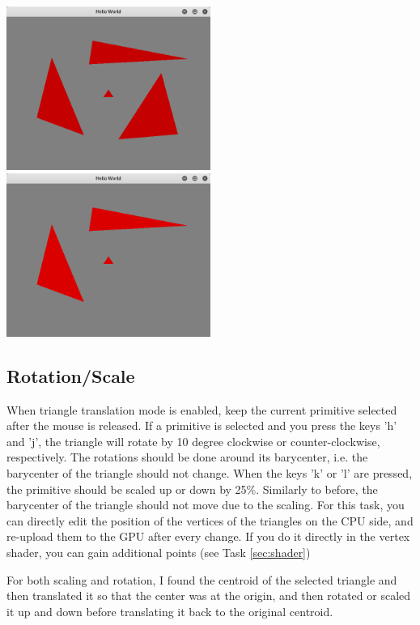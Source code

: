 \documentclass[11pt]{article}
\begin{document}
\includegraphics[width=0.5\textwidth]{deletebefore.png}
\includegraphics[width=0.5\textwidth]{deleteafter.png}
\subsection{Rotation/Scale}

When triangle translation mode is enabled, keep the current primitive selected after the mouse is released. If a primitive is selected and you press the keys 'h' and 'j', the triangle will rotate by 10 degree clockwise or counter-clockwise, respectively. The rotations should be done around its barycenter, i.e. the barycenter of the triangle should not change. When the keys 'k' or 'l' are pressed, the primitive should be scaled up or down by 25\%. Similarly to before, the barycenter of the triangle should not move due to the scaling. For this task, you can directly edit the position of the vertices of the triangles on the CPU side, and re-upload them to the GPU after every change. If you do it directly in the vertex shader, you can gain additional points (see Task \ref{sec:shader})

For both scaling and rotation, I found the centroid of the selected triangle and then translated it so that the center was at the origin, and then rotated or scaled it up and down before translating it back to the original centroid.
\end{document}
